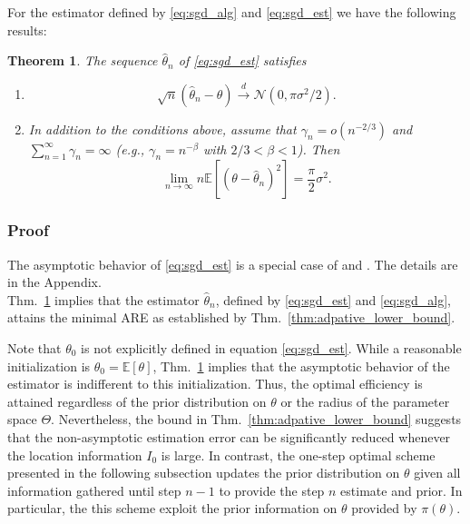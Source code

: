 \documentclass[letterpaper, conference,9pt]{IEEEtran}      %
\newtheorem{thm}{\bf{Theorem}}
\begin{document}
For the estimator defined by \eqref{eq:sgd_alg} and \eqref{eq:sgd_est} we have the following results:
\begin{thm} \label{thm:sgd}
The sequence $\widehat{\theta}_n$ of \eqref{eq:sgd_est} satisfies
\begin{enumerate}
\item[(i)]
\[
\sqrt{n} \left( \widehat{\theta}_n - \theta \right) \overset{d}{\rightarrow} \mathcal N \left(0,  \pi \sigma^2 /2 \right).
\]
\item[(ii)] In addition to the conditions above, assume that $\gamma_n = o(n^{-2/3})$ and $\sum_{n=1}^\infty \gamma_n = \infty$ (e.g., $\gamma_n = n^{-\beta}$ with $2/3<\beta<1$). Then
\[
\lim_{n\rightarrow \infty} n\mathbb E \left[ \left(\theta-\widehat{\theta}_n \right)^2 \right] = \frac{\pi}{2} \sigma^2 . 
\]
\end{enumerate}

\end{thm}

\subsubsection*{Proof}
The asymptotic behavior of \eqref{eq:sgd_est} is a special case of \cite[Thm. 4]{polyak1992acceleration} and \cite[Thm. 2]{polyak1990new}. The details are in the Appendix.\\

Thm.~\ref{thm:sgd} implies that the estimator $\widehat{\theta}_n$, defined by \eqref{eq:sgd_est} and \eqref{eq:sgd_alg}, attains the minimal ARE as established by Thm.~\ref{thm:adpative_lower_bound}.
\par
Note that $\theta_0$ is not explicitly defined 
in equation \eqref{eq:sgd_est}. While a reasonable initialization is $\theta_0 = \mathbb E [\theta]$, Thm.~\ref{thm:sgd} implies that the asymptotic behavior of the estimator is indifferent to this initialization. Thus, the optimal efficiency is attained regardless of the prior distribution on $\theta$ or the radius of the parameter space $\Theta$. Nevertheless, the bound in Thm.~\ref{thm:adpative_lower_bound} suggests that the non-asymptotic estimation error can be significantly reduced whenever the location information $I_0$ is large. In contrast, the one-step optimal scheme presented in the following subsection updates the prior distribution on $\theta$ given all information gathered until step $n-1$ to provide the step $n$ estimate and prior. In particular, the this scheme exploit the prior information on $\theta$ provided by $\pi(\theta)$. 
\end{document}
